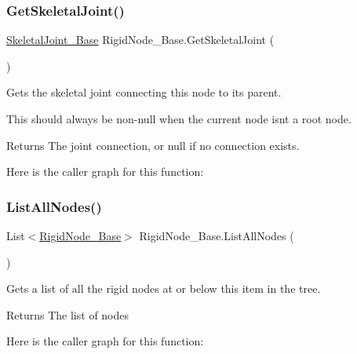 \subsubsection{\texorpdfstring{Get\+Skeletal\+Joint()}{GetSkeletalJoint()}}
{\footnotesize\ttfamily \hyperlink{class_skeletal_joint___base}{Skeletal\+Joint\+\_\+\+Base} Rigid\+Node\+\_\+\+Base.\+Get\+Skeletal\+Joint (\begin{DoxyParamCaption}{ }\end{DoxyParamCaption})}



Gets the skeletal joint connecting this node to its parent. 

This should always be non-\/null when the current node isn\textquotesingle{}t a root node. 

\begin{DoxyReturn}{Returns}
The joint connection, or null if no connection exists.
\end{DoxyReturn}
Here is the caller graph for this function\+:
\mbox{\label{class_rigid_node___base_aebef38e79a3b7a54dd769db5c6ae6a40}} 
\subsubsection{\texorpdfstring{List\+All\+Nodes()}{ListAllNodes()}\hspace{0.1cm}{\footnotesize\ttfamily [1/2]}}
{\footnotesize\ttfamily List$<$\hyperlink{class_rigid_node___base}{Rigid\+Node\+\_\+\+Base}$>$ Rigid\+Node\+\_\+\+Base.\+List\+All\+Nodes (\begin{DoxyParamCaption}{ }\end{DoxyParamCaption})}



Gets a list of all the rigid nodes at or below this item in the tree. 

\begin{DoxyReturn}{Returns}
The list of nodes
\end{DoxyReturn}
Here is the caller graph for this function\+:
\mbox{\label{class_rigid_node___base_aef149d0976f10b042ee989c9854b441f}} 
